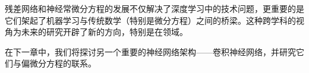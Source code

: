 残差网络和神经常微分方程的发展不仅解决了深度学习中的技术问题，更重要的是它们架起了机器学习与传统数学（特别是微分方程）之间的桥梁。这种跨学科的视角为未来的研究开辟了新的方向，特别是在领域。

在下一章中，我们将探讨另一个重要的神经网络架构——卷积神经网络，并研究它们与偏微分方程的联系。